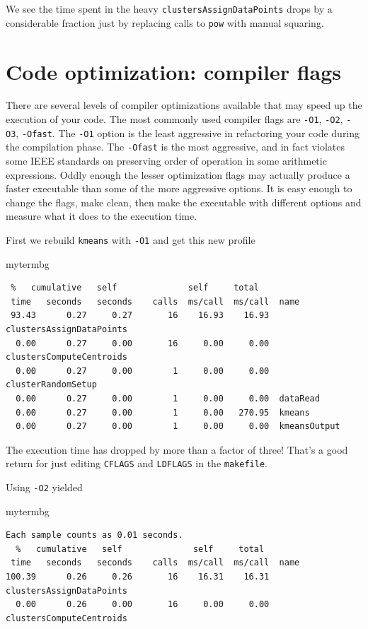 We see the time spent in the heavy \texttt{clustersAssignDataPoints} drops by a considerable fraction just by replacing calls to \texttt{pow} with manual  squaring.


\section{Code optimization: compiler flags}

There are several levels of compiler optimizations available that may speed up the execution of your code. The most commonly used compiler flags are \texttt{-O1}, \texttt{-O2}, \texttt{-O3}, \texttt{-Ofast}. The \texttt{-O1} option is the least aggressive in refactoring your code during the compilation phase. The \texttt{-Ofast} is the most aggressive, and in fact violates some IEEE standards on preserving order of operation in some arithmetic expressions. Oddly enough the lesser optimization flags may actually produce a faster executable than some of the more aggressive options. It is easy enough to change the flags, make clean, then make the executable with different options and measure what it does to the execution time.

First we rebuild \texttt{kmeans} with \texttt{-O1} and get this new profile

\begin{tsession}{mytermbg}
\begin{Verbatim}
 %   cumulative   self              self     total           
 time   seconds   seconds    calls  ms/call  ms/call  name    
 93.43      0.27     0.27       16    16.93    16.93  clustersAssignDataPoints
  0.00      0.27     0.00       16     0.00     0.00  clustersComputeCentroids
  0.00      0.27     0.00        1     0.00     0.00  clusterRandomSetup
  0.00      0.27     0.00        1     0.00     0.00  dataRead
  0.00      0.27     0.00        1     0.00   270.95  kmeans
  0.00      0.27     0.00        1     0.00     0.00  kmeansOutput
\end{Verbatim}
\end{tsession} 

The execution time has dropped by more than a factor of three! That's a good return for just editing \texttt{CFLAGS} and \texttt{LDFLAGS} in the \texttt{makefile}.

Using \texttt{-O2} yielded

\begin{tsession}{mytermbg}
\begin{Verbatim}
Each sample counts as 0.01 seconds.
  %   cumulative   self              self     total           
 time   seconds   seconds    calls  ms/call  ms/call  name    
100.39      0.26     0.26       16    16.31    16.31  clustersAssignDataPoints
  0.00      0.26     0.00       16     0.00     0.00  clustersComputeCentroids
\end{Verbatim}
\end{tsession} 

